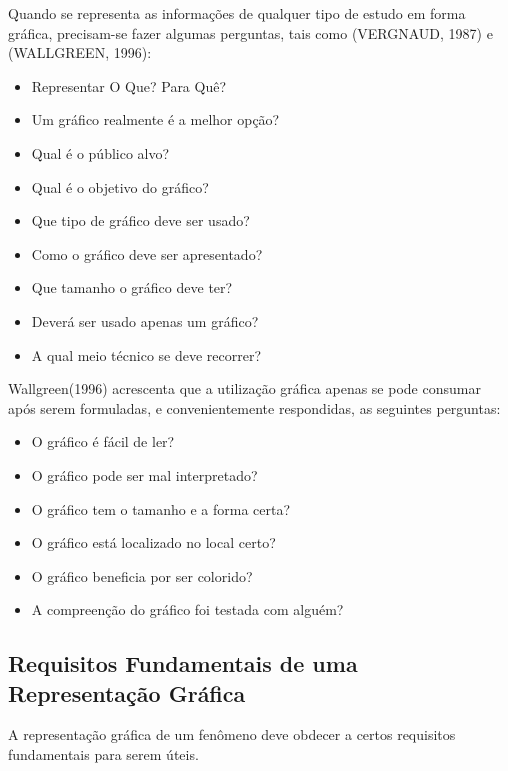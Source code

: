 Quando se representa as informações de qualquer tipo de estudo em forma gráfica, precisam-se fazer algumas perguntas, tais como (VERGNAUD, 1987) e (WALLGREEN, 1996):

\begin{itemize}
\item Representar O Que? Para Quê?
\item Um gráfico realmente é a melhor opção?
\item Qual é o público alvo?
\item Qual é o objetivo do gráfico?
\item Que tipo de gráfico deve ser usado?
\item Como o gráfico deve ser apresentado?
\item Que tamanho o gráfico deve ter?
\item Deverá ser usado apenas um gráfico?
\item A qual meio técnico se deve recorrer?
\end{itemize}

Wallgreen(1996) acrescenta que a utilização gráfica apenas se pode
consumar após serem formuladas, e convenientemente respondidas, as
seguintes perguntas:

\begin{itemize}
\item O gráfico é fácil de ler? \item O gráfico pode ser mal
interpretado? \item O gráfico tem o tamanho e a forma certa? \item
O gráfico está localizado no local certo? \item O gráfico
beneficia por ser colorido? \item A compreenção do gráfico foi
testada com alguém?
\end{itemize}



\subsection{Requisitos Fundamentais de uma Representação Gráfica}

A representação gráfica de um fenômeno deve obdecer a certos
requisitos fundamentais para serem úteis.

